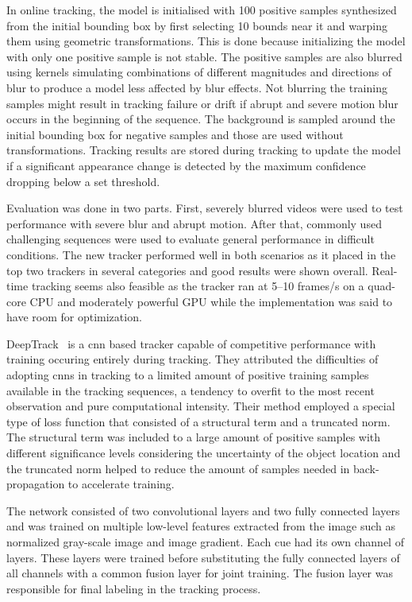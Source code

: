 In online tracking, the model is initialised with 100 positive samples synthesized from the
initial bounding box by first selecting 10 bounds near it and warping them using geometric
transformations. This is done because initializing the model with only one positive sample
is not stable. The positive samples are also blurred using kernels simulating combinations
of different magnitudes and directions of blur to produce a model less affected by blur
effects. Not blurring the training samples might result in tracking failure or drift if
abrupt and severe motion blur occurs in the beginning of the sequence. The background is
sampled around the initial bounding box for negative samples and those are used without
transformations. Tracking results are stored during tracking to update the model if a
significant appearance change is detected by the maximum confidence dropping below a set
threshold.~\cite{BLUR_TRACK}

Evaluation was done in two parts. First, severely blurred videos were used to test
performance with severe blur and abrupt motion. After that, commonly used challenging
sequences were used to evaluate general performance in difficult conditions. The new
tracker performed well in both scenarios as it placed in the top two trackers in several
categories and good results were shown overall. Real-time tracking seems also feasible
as the tracker ran at 5--10 frames/s on a quad-core CPU and moderately powerful GPU while
the implementation was said to have room for optimization.

DeepTrack~\cite{DEEPTRACK} is a \ac{cnn} based tracker capable of competitive performance
with training occuring entirely during tracking. They attributed the difficulties of
adopting \ac{cnn}s in tracking to a limited amount of positive training samples available
in the tracking sequences, a tendency to overfit to the most recent observation and pure
computational intensity. Their method employed a special type of loss function that
consisted of a structural term and a truncated norm. The structural term was included
to a large amount of positive samples with different significance levels considering
the uncertainty of the object location and the truncated norm helped to reduce the
amount of samples needed in back-propagation to accelerate training.

The network consisted of two convolutional layers and two fully connected layers and
was trained on multiple low-level features extracted from the image such as normalized
gray-scale image and image gradient. Each cue had its own channel of layers. These
layers were trained before substituting the fully connected layers of all channels
with a common fusion layer for joint training. The fusion layer was responsible for
final labeling in the tracking process. 

